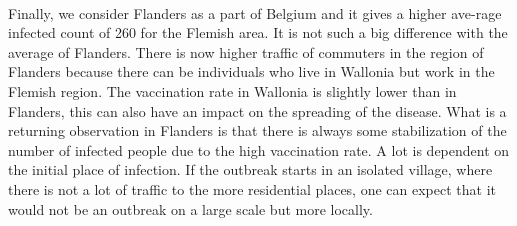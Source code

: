 \documentclass[runningheads]{llncs}
\begin{document}
	\noindent\\
    Finally, we consider Flanders as a part of Belgium and it gives a higher ave-rage infected count of 260 for the Flemish area. It is not such a big difference with the average of Flanders. There is now higher traffic of commuters in the region of Flanders because there can be individuals who live in Wallonia but work in the Flemish region. The vaccination rate in Wallonia is slightly lower than in Flanders, this can also have an impact on the spreading of the disease. What is a returning observation in Flanders is that there is always some stabilization of the number of infected people due to the high vaccination rate. A lot is dependent on the initial place of infection. If the outbreak starts in an isolated village, where there is not a lot of traffic to the more residential places, one can expect that it would not be an outbreak on a large scale but more locally.
	
\end{document}
